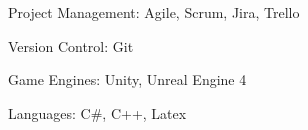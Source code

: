 


\begin{cvparagraph}
    
    \begin{cvitems}
        \text{}
        \item
        \item Project Management: Agile, Scrum, Jira, Trello
        \item Version Control: Git
        \item Game Engines: Unity, Unreal Engine 4
        \item Languages: C\#, C++, Latex
    \end{cvitems}

\end{cvparagraph}